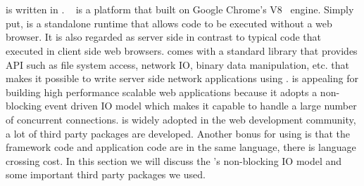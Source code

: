 







\section{\nodejs}

\cb is written in \nodejs.
\nodejs~\cite{tilkov2010node} is a platform that built on Google Chrome's V8~\cite{v8} \js engine.
Simply put, \nodejs is a standalone \js runtime that allows \js code to be
executed without a web browser.
It is also regarded as server side \js in contrast to typical \js code that executed in
client side web browsers.
\nodejs comes with a standard library that provides API
such as file system access, network IO, binary data manipulation, etc.
that makes it possible to write server side network applications using \js.
\nodejs is appealing for building high performance scalable web applications
because it adopts a non-blocking event driven IO model which makes it capable 
to handle a large number of concurrent connections.
\nodejs is widely adopted in the web development community,
a lot of third party packages are developed.
Another bonus for using \nodejs is that the \cb framework code and application code
are in the same language, there is language crossing cost.
In this section we will discuss the \nodejs's non-blocking IO model and some important
third party packages we used.

